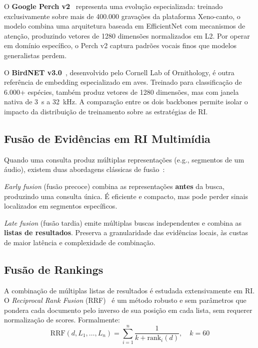 \documentclass[12pt]{article}
\begin{document}
O \textbf{Google Perch v2}~\cite{merriënboer:25} representa uma evolução
especializada: treinado exclusivamente sobre mais de 400.000 gravações da
plataforma Xeno-canto, o modelo combina uma arquitetura baseada em EfficientNet
com mecanismos de atenção, produzindo vetores de 1280 dimensões normalizados em
L2. Por operar em domínio específico, o Perch v2 captura padrões vocais finos
que modelos generalistas perdem.

O \textbf{BirdNET v3.0}~\cite{kahl:21}, desenvolvido pelo Cornell Lab of
Ornithology, é outra referência de embedding especializado em aves. Treinado
para classificação de 6.000+ espécies, também produz vetores de 1280 dimensões,
mas com janela nativa de 3~s a 32~kHz. A comparação entre os dois backbones
permite isolar o impacto da distribuição de treinamento sobre as estratégias
de RI.

\subsection{Fusão de Evidências em RI Multimídia}

Quando uma consulta produz múltiplas representações (e.g., segmentos de um
áudio), existem duas abordagens clássicas de fusão~\cite{baeza:99}:

\textit{Early fusion} (fusão precoce) combina as representações \textbf{antes}
da busca, produzindo uma consulta única. É eficiente e compacto, mas pode
perder sinais localizados em segmentos específicos.

\textit{Late fusion} (fusão tardia) emite múltiplas buscas independentes e
combina as \textbf{listas de resultados}. Preserva a granularidade das evidências
locais, às custas de maior latência e complexidade de combinação.

\subsection{Fusão de Rankings}

A combinação de múltiplas listas de resultados é estudada extensivamente em RI.
O \textit{Reciprocal Rank Fusion} (RRF)~\cite{cormack:09} é um método robusto
e sem parâmetros que pondera cada documento pelo inverso de sua posição em cada
lista, sem requerer normalização de scores. Formalmente:
\begin{equation}
  \text{RRF}(d, L_1,\ldots,L_n) = \sum_{i=1}^{n}
  \frac{1}{k + \text{rank}_i(d)}, \quad k = 60
  \label{eq:rrf}
\end{equation}
\end{document}
